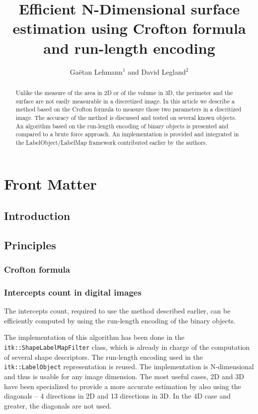 \documentclass{InsightArticle}
\title{Efficient N-Dimensional surface estimation using Crofton formula and run-length encoding}
\author{Ga\"etan Lehmann{$^1$} {\small{and}} David Legland{$^2$}}
\begin{document}
\maketitle

\ifhtml
\chapter*{Front Matter\label{front}}
\fi


\begin{abstract}
\noindent
Unlike the measure of the area in 2D or of the volume in 3D, the perimeter and the surface are not easily measurable in a discretized image.
In this article we describe a method based on the Crofton formula to measure those two parameters in a discritized image. The accuracy of
the method is discussed and tested on several known objects. An algorithm based on the run-length encoding of binary objects is presented
and compared to a brute force approach.
An implementation is provided and integrated in the LabelObject/LabelMap framework contributed earlier by the authors.
\end{abstract}

\tableofcontents

\section{Introduction}

\section{Principles}
\subsection{Crofton formula}

\subsection{Intercepts count in digital images}

The intercepts count, required to use the method described earlier, can be efficiently computed by using the run-length
encoding of the binary objects.

The implementation of this algorithm has been done in the \verb$itk::ShapeLabelMapFilter$ class, which is already in charge of the computation of
several shape descriptors. The run-length encoding used in the \verb$itk::LabelObject$ representation is reused.
The implementation is N-dimensional and thus is usable for any image dimension. The most useful cases, 2D and 3D have been specialized
to provide a more accurate estimation by also using the diagonals -- 4 directions in 2D and 13 directions in 3D. In the 4D case and greater,
the diagonals are not used.
\end{document}
